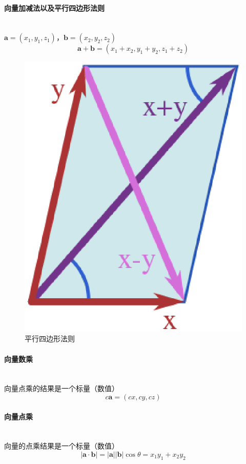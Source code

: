 \documentclass[a4paper, 11pt, oneside]{article}
\newcommand{\bol}[1]{\textbf{#1}}
\begin{document}
\paragraph{向量加减法以及平行四边形法则}\quad\\
\indent$\bol{a} = (x_1, y_1, z_1)$，$\bol{b} = (x_2, y_2, z_2)$
\begin{displaymath}
	\bol{a} + \bol{b} = (x_1 + x_2, y_1 + y_2, z_1 + z_2)
\end{displaymath}
\begin{figure}[!h]
\center
\includegraphics[scale=0.5]{./asset/parallelogram_law.eps}
\caption{平行四边形法则}
\end{figure}
\paragraph{向量数乘}\quad\\
\indent 向量点乘的结果是一个标量（数值）
\begin{displaymath}
	c\bol{a} = (cx, cy, cz)
\end{displaymath}
\paragraph{向量点乘}\quad\\
\indent 向量的点乘结果是一个标量（数值）
\begin{displaymath}
	\vert\bol{a}\cdot\bol{b}\vert = \vert \bol{a} \vert \vert \bol{b} \vert \cos{\theta} = x_1y_1 + x_2y_2
\end{displaymath}
\end{document}
